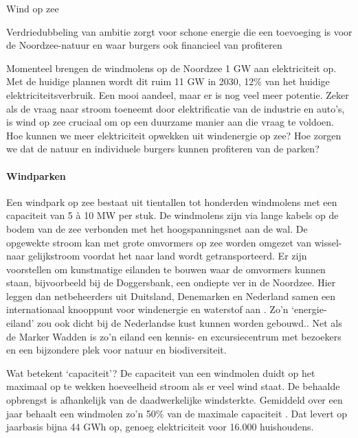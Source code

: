\begin{voorstel}{Wind op zee}

\begin{samenvatting}
Verdriedubbeling van ambitie zorgt voor schone energie die een toevoeging is voor de Noordzee-natuur en waar burgers ook financieel van profiteren
\end{samenvatting}

\begin{uitdaging}
Momenteel brengen de windmolens op de Noordzee 1 GW aan elektriciteit op. Met de huidige plannen wordt dit ruim 11 GW in 2030, 12\% van het huidige elektriciteitsverbruik. Een mooi aandeel, maar er is nog veel meer potentie. Zeker als de vraag naar stroom toeneemt door elektrificatie van de industrie en auto’s, is wind op zee cruciaal om op een duurzame manier aan die vraag te voldoen. Hoe kunnen we meer elektriciteit opwekken uit windenergie op zee? Hoe zorgen we dat de natuur en individuele burgers kunnen profiteren van de parken?
\end{uitdaging}

\begin{overwegingen}

\paragraph{Windparken}
Een windpark op zee bestaat uit tientallen tot honderden windmolens met een capaciteit van 5 à 10 MW per stuk. De windmolens zijn via lange kabels op de bodem van de zee verbonden met het hoogspanningsnet aan de wal. De opgewekte stroom kan met grote omvormers op zee worden omgezet van wissel- naar gelijkstroom voordat het naar land wordt getransporteerd.  Er zijn voorstellen om kunstmatige eilanden te bouwen waar de omvormers kunnen staan, bijvoorbeeld bij de Doggersbank, een ondiepte ver in de Noordzee. Hier leggen dan netbeheerders uit Duitsland, Denemarken en Nederland samen een internationaal knooppunt voor windenergie en waterstof aan \parencite{north_sea_wind_power_hub_north_2019}. Zo’n ‘energie-eiland’ zou ook dicht bij de Nederlandse kust kunnen worden gebouwd.. Net als de Marker Wadden is zo’n eiland een kennis- en excursiecentrum met bezoekers en een bijzondere plek voor natuur en biodiversiteit.

\begin{infobox}{Wat betekent ‘capaciteit’?}
De capaciteit van een windmolen duidt op het maximaal op te wekken hoeveelheid stroom als er veel wind staat. De behaalde opbrengst is afhankelijk van de daadwerkelijke windsterkte. Gemiddeld over een jaar behaalt een windmolen zo’n 50\% van de maximale capaciteit \parencite{lensink_kosten_2017}. Dat levert op jaarbasis bijna 44 GWh op, genoeg elektriciteit voor 16.000 huishoudens.
\end{infobox}


\end{overwegingen}
\end{voorstel}
